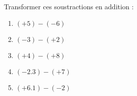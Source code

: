 
\begin{exercice}\label{exo2smath-0214}

    Transformer ces soustractions en addition :
    \begin{multicols}{2}
        \begin{enumerate}
            \item
                \( (+5)-(-6)\)
            \item
                \( (-3)-(+2)\)
            \item
                \( (+4)-(+8)\)

            \item
                \( (-2.3)-(+7)\)
            \item
                \( (+6.1)-(-2)\)
        \end{enumerate}
    \end{multicols}

\end{exercice}
